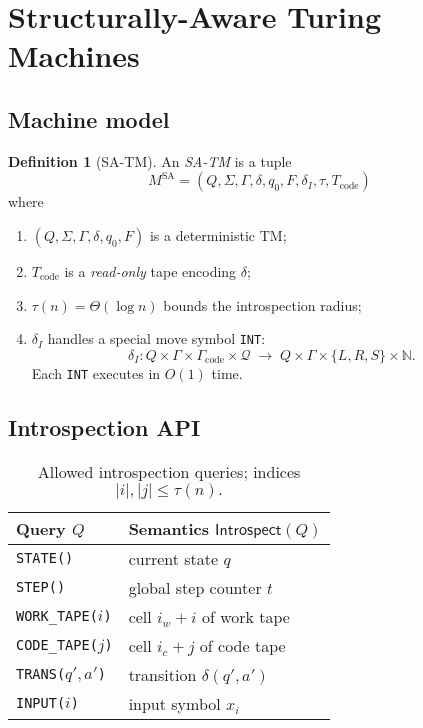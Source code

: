 \documentclass[12pt]{article}
\newcommand{\SA}{\mathrm{SA}}
\newcommand{\trans}{\delta}
\theoremstyle{definition}
\newtheorem{definition}{Definition}[section]
\theoremstyle{plain}
\theoremstyle{remark}
\begin{document}
\section{Structurally-Aware Turing Machines}\label{sec:satm}

\subsection{Machine model}
\begin{definition}[SA-TM]\label{def:satm}
An \emph{SA-TM} is a tuple
\[
   M^{\SA}=(Q,\Sigma,\Gamma,\trans,q_0,F,\trans_I,\tau,T_\text{code})
\]
where
\begin{enumerate}
  \item \((Q,\Sigma,\Gamma,\trans,q_0,F)\) is a deterministic TM;
  \item \(T_\text{code}\) is a \emph{read-only} tape encoding \(\trans\);
  \item \(\tau(n)=\Theta(\log n)\) bounds the introspection radius;
  \item \(\trans_I\) handles a special move symbol \texttt{INT}:
        \[
          \trans_I\colon
          Q\times\Gamma\times\Gamma_\text{code}\times\mathcal Q
           \;\to\;
          Q\times\Gamma\times\{L,R,S\}\times\mathbb N.
        \]
        Each \texttt{INT} executes in \(O(1)\) time.
\end{enumerate}
\end{definition}

\subsection{Introspection API}

\begin{table}[ht]                                   %
\centering
\begin{tabular}{@{}ll@{}}
\toprule
\textbf{Query \(Q\)} & \textbf{Semantics \(\mathsf{Introspect}(Q)\)}\\
\midrule
\texttt{STATE()}        & current state \(q\)\\
\texttt{STEP()}         & global step counter \(t\)\\
\texttt{WORK\_TAPE(\(i\))} & cell \(i_w+i\) of work tape\\
\texttt{CODE\_TAPE(\(j\))} & cell \(i_c+j\) of code tape\\
\texttt{TRANS(\(q',a'\))}  & transition \(\trans(q',a')\)\\
\texttt{INPUT(\(i\))}      & input symbol \(x_i\)\\
\bottomrule
\end{tabular}
\caption{Allowed introspection queries; indices
 \(\lvert i\rvert,\lvert j\rvert\le\tau(n).\)}
\label{tab:intro}
\end{table}
\end{document}
